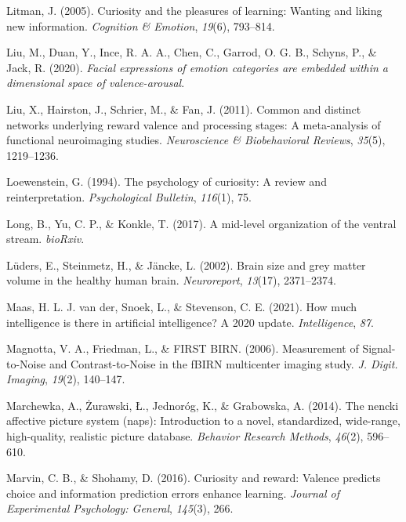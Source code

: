 \documentclass[12pt,american,a4paper,oneside,]{memoir} %
\begin{document}
\leavevmode\hypertarget{ref-litman2005curiosity}{}%
Litman, J. (2005). Curiosity and the pleasures of learning: Wanting and liking new information. \emph{Cognition \& Emotion}, \emph{19}(6), 793--814.

\leavevmode\hypertarget{ref-Liu2020-vo}{}%
Liu, M., Duan, Y., Ince, R. A. A., Chen, C., Garrod, O. G. B., Schyns, P., \& Jack, R. (2020). \emph{Facial expressions of emotion categories are embedded within a dimensional space of valence-arousal}.

\leavevmode\hypertarget{ref-liu2011common}{}%
Liu, X., Hairston, J., Schrier, M., \& Fan, J. (2011). Common and distinct networks underlying reward valence and processing stages: A meta-analysis of functional neuroimaging studies. \emph{Neuroscience \& Biobehavioral Reviews}, \emph{35}(5), 1219--1236.

\leavevmode\hypertarget{ref-loewenstein1994psychology}{}%
Loewenstein, G. (1994). The psychology of curiosity: A review and reinterpretation. \emph{Psychological Bulletin}, \emph{116}(1), 75.

\leavevmode\hypertarget{ref-Long2017-fb}{}%
Long, B., Yu, C. P., \& Konkle, T. (2017). A mid-level organization of the ventral stream. \emph{bioRxiv}.

\leavevmode\hypertarget{ref-Luders2002-ms}{}%
Lüders, E., Steinmetz, H., \& Jäncke, L. (2002). Brain size and grey matter volume in the healthy human brain. \emph{Neuroreport}, \emph{13}(17), 2371--2374.

\leavevmode\hypertarget{ref-Van_der_Maas2021-rx}{}%
Maas, H. L. J. van der, Snoek, L., \& Stevenson, C. E. (2021). How much intelligence is there in artificial intelligence? A 2020 update. \emph{Intelligence}, \emph{87}.

\leavevmode\hypertarget{ref-Magnotta2006-zs}{}%
Magnotta, V. A., Friedman, L., \& FIRST BIRN. (2006). Measurement of Signal-to-Noise and Contrast-to-Noise in the fBIRN multicenter imaging study. \emph{J. Digit. Imaging}, \emph{19}(2), 140--147.

\leavevmode\hypertarget{ref-marchewka2014nencki}{}%
Marchewka, A., Żurawski, Ł., Jednoróg, K., \& Grabowska, A. (2014). The nencki affective picture system (naps): Introduction to a novel, standardized, wide-range, high-quality, realistic picture database. \emph{Behavior Research Methods}, \emph{46}(2), 596--610.

\leavevmode\hypertarget{ref-marvin2016curiosity}{}%
Marvin, C. B., \& Shohamy, D. (2016). Curiosity and reward: Valence predicts choice and information prediction errors enhance learning. \emph{Journal of Experimental Psychology: General}, \emph{145}(3), 266.
\end{document}
